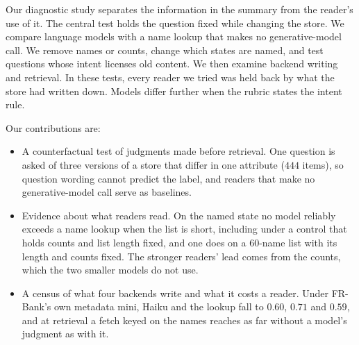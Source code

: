 \documentclass{article}
\begin{document}
Our diagnostic study separates the information in the summary from the reader's use of it. The central test holds the question fixed while changing the store. We compare language models with a name lookup that makes no generative-model call. We remove names or counts, change which states are named, and test questions whose intent licenses old content. We then examine backend writing and retrieval.
In these tests, every reader we tried was held back by what the store had written down.
Models differ further when the rubric states the intent rule.

Our contributions are:
\begin{itemize}\setlength{\itemsep}{1pt}
\item A counterfactual test of judgments made before retrieval. One question is asked of three versions of a store that differ in one attribute ($444$ items), so question wording cannot predict the label, and readers that make no generative-model call serve as baselines.
\item Evidence about what readers read. On the named state no model reliably exceeds a name lookup when the list is short, including under a control that holds counts and list length fixed, and one does on a $60$-name list with its length and counts fixed. The stronger readers' lead comes from the counts, which the two smaller models do not use.
\item A census of what four backends write and what it costs a reader. Under FR-Bank's own metadata mini, Haiku and the lookup fall to $0.60$, $0.71$ and $0.59$, and at retrieval a fetch keyed on the names reaches as far without a model's judgment as with it.
\end{itemize}
\end{document}
